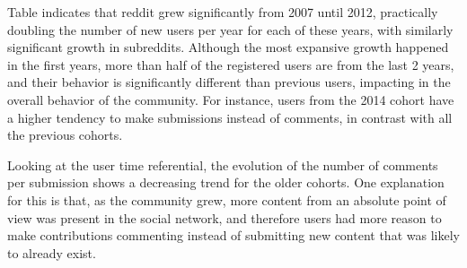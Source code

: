 Table indicates that reddit grew significantly from 2007 until 2012, practically doubling the number of new users per year for each of these years, with similarly significant growth in subreddits. Although the most expansive growth happened in the first years, more than half of the registered users are from the last 2 years, and their behavior is significantly different than previous users, impacting in the overall behavior of the community. For instance, users from the 2014 cohort have a higher tendency to make submissions instead of comments, in contrast with all the previous cohorts.

Looking at the user time referential, the evolution of the number of comments per submission shows a decreasing trend for the older cohorts. One explanation for this is that, as the community grew, more content from an absolute point of view was present in the social network, and therefore users had more reason to make contributions commenting instead of submitting new content that was likely to already exist.

